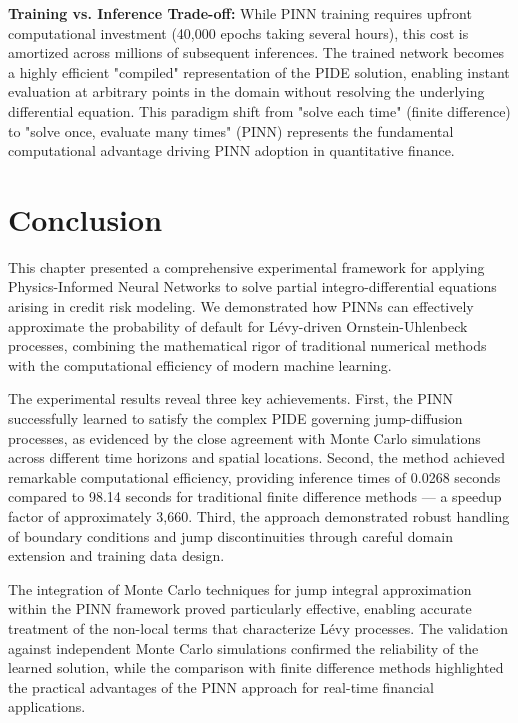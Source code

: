 \documentclass[11pt,twoside,openright]{report}
\begin{document}
\textbf{Training vs. Inference Trade-off:} While PINN training requires upfront computational investment (40,000 epochs taking several hours), this cost is amortized across millions of subsequent inferences. The trained network becomes a highly efficient "compiled" representation of the PIDE solution, enabling instant evaluation at arbitrary points in the domain without resolving the underlying differential equation. This paradigm shift from "solve each time" (finite difference) to "solve once, evaluate many times" (PINN) represents the fundamental computational advantage driving PINN adoption in quantitative finance.

\section{Conclusion}
\label{sec:exp_conclusion}

This chapter presented a comprehensive experimental framework for applying Physics-Informed Neural Networks to solve partial integro-differential equations arising in credit risk modeling. We demonstrated how PINNs can effectively approximate the probability of default for Lévy-driven Ornstein-Uhlenbeck processes, combining the mathematical rigor of traditional numerical methods with the computational efficiency of modern machine learning.

The experimental results reveal three key achievements. First, the PINN successfully learned to satisfy the complex PIDE governing jump-diffusion processes, as evidenced by the close agreement with Monte Carlo simulations across different time horizons and spatial locations. Second, the method achieved remarkable computational efficiency, providing inference times of 0.0268 seconds compared to 98.14 seconds for traditional finite difference methods — a speedup factor of approximately 3,660. Third, the approach demonstrated robust handling of boundary conditions and jump discontinuities through careful domain extension and training data design.

The integration of Monte Carlo techniques for jump integral approximation within the PINN framework proved particularly effective, enabling accurate treatment of the non-local terms that characterize Lévy processes. The validation against independent Monte Carlo simulations confirmed the reliability of the learned solution, while the comparison with finite difference methods highlighted the practical advantages of the PINN approach for real-time financial applications.
\end{document}
